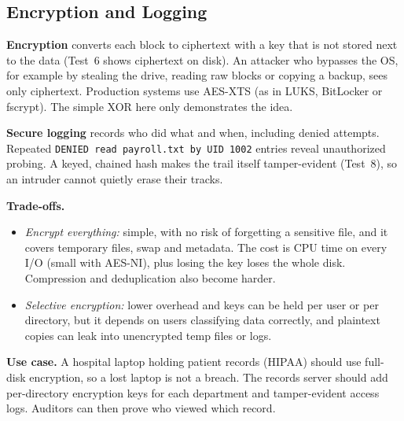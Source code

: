 \documentclass[11pt]{article}
\begin{document}
\subsection{Encryption and Logging}
\textbf{Encryption} converts each block to ciphertext with a key that is not
stored next to the data (Test~6 shows ciphertext on disk). An attacker who
bypasses the OS, for example by stealing the drive, reading raw blocks or
copying a backup, sees only ciphertext. Production systems use AES-XTS (as
in LUKS, BitLocker or fscrypt). The simple XOR here only demonstrates the
idea.

\textbf{Secure logging} records who did what and when, including denied
attempts. Repeated \texttt{DENIED read payroll.txt by UID 1002} entries
reveal unauthorized probing. A keyed, chained hash makes the trail itself
tamper-evident (Test~8), so an intruder cannot quietly erase their tracks.

\textbf{Trade-offs.}
\begin{itemize}
  \item \emph{Encrypt everything:} simple, with no risk of forgetting a
        sensitive file, and it covers temporary files, swap and metadata.
        The cost is CPU time on every I/O (small with AES-NI), plus losing
        the key loses the whole disk. Compression and deduplication also
        become harder.
  \item \emph{Selective encryption:} lower overhead and keys can be held
        per user or per directory, but it depends on users classifying data
        correctly, and plaintext copies can leak into unencrypted temp files
        or logs.
\end{itemize}

\textbf{Use case.} A hospital laptop holding patient records (HIPAA) should
use full-disk encryption, so a lost laptop is not a breach. The records
server should add per-directory encryption keys for each department and
tamper-evident access logs. Auditors can then prove who viewed which record.
\end{document}
